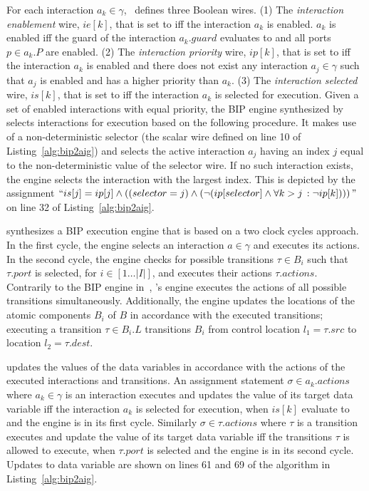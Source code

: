 For each interaction $a_k \in \gamma$, \biptool~defines three Boolean wires. 
(1) The {\em interaction enablement} wire, $ie[k]$, that is set to \true{} iff the interaction
$a_k$ is enabled. $a_k$ is enabled iff the guard of the interaction $a_k.guard$ evaluates
to \true{} and all ports $p \in a_k.P$ are enabled.  
(2) The {\em interaction priority} wire, $ip[k]$, that is set to \true{} iff the interaction 
$a_k$ is enabled and there does not exist any interaction $a_j \in \gamma$ such that 
$a_j$ is enabled and has a higher priority than $a_k$.
(3) The {\em interaction selected} wire, $is[k]$, that is set to \true{} iff the
interaction $a_k$ is selected for execution. Given a set of enabled interactions 
with equal priority, the BIP engine synthesized by \biptool{}
selects interactions for execution based on the following procedure. It makes use of a
non-deterministic selector (the  scalar wire defined on line 10 
of Listing~\ref{alg:bip2aig}) and selects the active interaction $a_j$ having 
an index $j$ equal to the non-deterministic value of the selector wire.
If no such interaction exists, the engine selects the interaction with the largest 
index. 
This is depicted by the assignment $``is[j] = ip[j] \land \left( (selector = j) 
\land (\lnot (ip[selector] \land \forall{k > j}\,:\lnot ip[k])) \right)"$ on line 32 of Listing~\ref{alg:bip2aig}.

\biptool{} synthesizes a BIP execution engine that is based on a two clock cycles 
approach. In the first cycle, the engine selects an interaction $a \in \gamma$ 
and executes its actions. In the second cycle, the engine checks for possible
transitions $\tau \in B_i$ such that $\tau.port$ is selected, for $i \in [1\ldots|I|]$,
and executes their actions $\tau.actions$. Contrarily to the BIP engine in~\cite{BasuBBCJNS11},
\biptool's engine executes the actions of all possible transitions simultaneously.
Additionally, the engine updates the locations of the atomic components $B_i$ of $B$
in accordance with the executed transitions; \ie{} executing a transition $\tau \in B_i.L$ 
transitions $B_i$ from control location $l_1 = \tau.src$ to location $l_2 = \tau.dest$.

\biptool{} updates the values of the data variables in accordance with the 
actions of the executed interactions and transitions. An assignment statement 
$\sigma \in a_k.actions$ where $a_k \in \gamma$ is an interaction executes 
and updates the value of its target data variable iff the interaction $a_k$ 
is selected for execution, \ie when $is[k]$ evaluate to \true{} and the engine
is in its first cycle. Similarly $\sigma \in \tau.actions$ where $\tau$ is a transition
executes and update the value of its target data variable iff the transitions $\tau$
is allowed to execute, \ie when $\tau.port$ is selected and the engine is in its
second cycle. Updates to data variable are shown on lines 61 and 69 of the 
algorithm in Listing~\ref{alg:bip2aig}.


